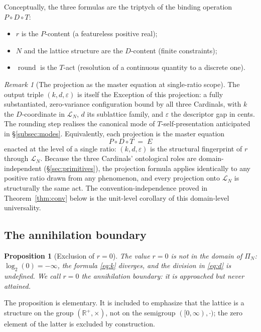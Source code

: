 \documentclass[11pt,a4paper]{article}
\newtheorem{proposition}[theorem]{Proposition}
\theoremstyle{definition}
\theoremstyle{remark}
\newtheorem{remark}[theorem]{Remark}
\newcommand{\R}{\mathbb{R}}
\DeclareMathOperator{\round}{round}
\newcommand{\eps}{\varepsilon}
\newcommand{\PDT}{\ensuremath{P{\circ}D{\circ}T}}
\begin{document}
Conceptually, the three formulas are the triptych of the binding operation $P\circ D\circ T$:
\begin{itemize}[leftmargin=*]
\item $r$ is the $P$-content (a featureless positive real);
\item $N$ and the lattice structure are the $D$-content (finite constraints);
\item $\round$ is the $T$-act (resolution of a continuous quantity to a discrete one).
\end{itemize}

\begin{remark}[The projection as the master equation at single-ratio scope]\label{rem:single-ratio-exception}
The output triple $(k,d,\eps)$ is itself the Exception of this projection: a fully substantiated, zero-variance configuration bound by all three Cardinals, with $k$ the $D$-coordinate in $\mathcal{L}_{N}$, $d$ its sublattice family, and $\eps$ the descriptor gap in cents. The rounding step realises the canonical mode of $T$-self-presentation anticipated in \S\ref{subsec:modes}. Equivalently, each projection is the master equation
\[
\PDT \;=\; E
\]
enacted at the level of a single ratio: $(k,d,\eps)$ is the structural fingerprint of $r$ through $\mathcal{L}_{N}$. Because the three Cardinals' ontological roles are domain-independent (\S\ref{sec:primitives}), the projection formula applies identically to any positive ratio drawn from any phenomenon, and every projection onto $\mathcal{L}_{N}$ is structurally the same act. The convention-independence proved in Theorem~\ref{thm:conv} below is the unit-level corollary of this domain-level universality.
\end{remark}

\subsection{The annihilation boundary}

\begin{proposition}[Exclusion of $r=0$]\label{prop:zero}
The value $r=0$ is not in the domain of $\Pi_{N}$: $\log_{2}(0)=-\infty$, the formula \eqref{eq:k} diverges, and the division in \eqref{eq:d} is undefined. We call $r=0$ the \emph{annihilation boundary}: it is approached but never attained.
\end{proposition}

The proposition is elementary. It is included to emphasize that the lattice is a structure on the group $(\R^{+},\times)$, not on the semigroup $([0,\infty),\cdot)$; the zero element of the latter is excluded by construction.
\end{document}
